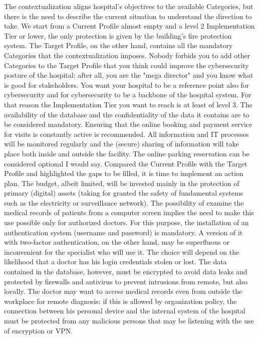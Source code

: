 The contextualization aligns hospital's objectives to the available Categories, but there is the need to describe the current situation to understand the direction to take.
We start from a Current Profile almost empty and a level 2 Implementation Tier or lower, the only protection is given by the building's fire protection system. The Target Profile, on the other hand, contains all the mandatory Categories that the contextualization imposes. Nobody forbids you to add other Categories to the Target Profile that you think could improve the cybersecurity posture of the hospital: after all, you are the "mega director" and you know what is good for stakeholders. You want your hospital to be a reference point also for cybersecurity and for cybersecurity to be a backbone of the hospital system. For that reason the Implementation Tier you want to reach is at least of level 3. The availability of the database and the confidentiality of the data it contains are to be considered mandatory. Ensuring that the online booking and payment service for visits is constantly active is recommended. All information and IT processes will be monitored regularly and the (secure) sharing of information will take place both inside and outside the facility. The online parking reservation can be considered optional I would say.\vspace{0.5cm}\newline
Compared the Current Profile with the Target Profile and highlighted the gaps to be filled, it is time to implement an action plan. The budget, albeit limited, will be invested mainly in the protection of primary (digital) assets (taking for granted the safety of fundamental systems such as the electricity or surveillance network). The possibility of examine the medical records of patients from a computer screen implies the need to make this use possible only for authorized doctors. For this purpose, the installation of an authentication system (username and password) is mandatory. A version of it with two-factor authentication, on the other hand, may be superfluous or inconvenient for the specialist who will use it. The choice will depend on the likelihood that a doctor has his login credentials stolen or lost. The data contained in the database, however, must be encrypted to avoid data leaks and protected by firewalls and antivirus to prevent intrusions from remote, but also locally.\newline
The doctor may want to access medical records even from outside the workplace for remote diagnosis: if this is allowed by organization policy, the connection between his personal device and the internal system of the hospital must be protected from any malicious persons that may be listening with the use of encryption or VPN.\newline
